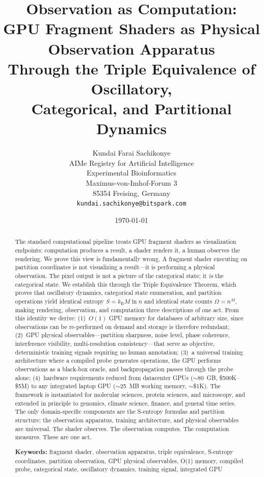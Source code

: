 \documentclass[11pt,twocolumn,a4paper]{article}
\title{\textbf{Observation as Computation:\\
GPU Fragment Shaders as Physical Observation Apparatus\\
Through the Triple Equivalence of Oscillatory,\\
Categorical, and Partitional Dynamics}}
\author{
Kundai Farai Sachikonye\\
AIMe Registry for Artificial Intelligence\\
Experimental Bioinformatics\\
Maximus-von-Imhof-Forum 3\\
85354 Freising, Germany\\
\texttt{kundai.sachikonye@bitspark.com}
}
\date{\today}
\theoremstyle{definition}
\theoremstyle{remark}
\newcommand{\kB}{k_{\mathrm{B}}}
\begin{document}
\maketitle

\begin{abstract}
The standard computational pipeline treats GPU fragment shaders as visualization endpoints: computation produces a result, a shader renders it, a human observes the rendering. We prove this view is fundamentally wrong. A fragment shader executing on partition coordinates is not visualizing a result---it is performing a physical observation. The pixel output is not a picture of the categorical state; it \emph{is} the categorical state. We establish this through the Triple Equivalence Theorem, which proves that oscillatory dynamics, categorical state enumeration, and partition operations yield identical entropy $S = \kB M \ln n$ and identical state counts $\Omega = n^M$, making rendering, observation, and computation three descriptions of one act. From this identity we derive: (1)~$O(1)$ GPU memory for databases of arbitrary size, since observations can be re-performed on demand and storage is therefore redundant; (2)~GPU physical observables---partition sharpness, noise level, phase coherence, interference visibility, multi-resolution consistency---that serve as objective, deterministic training signals requiring no human annotation; (3)~a universal training architecture where a compiled probe generates operations, the GPU performs observations as a black-box oracle, and backpropagation passes through the probe alone; (4)~hardware requirements reduced from datacenter GPUs ($\sim$80~GB, \$500K--\$5M) to any integrated laptop GPU ($\sim$25~MB working memory, $\sim$\$1K). The framework is instantiated for molecular sciences, protein sciences, and microscopy, and extended in principle to genomics, climate science, finance, and general time series. The only domain-specific components are the S-entropy formulas and partition structure; the observation apparatus, training architecture, and physical observables are universal. The shader observes. The observation computes. The computation measures. These are one act.

\medskip
\noindent\textbf{Keywords:} fragment shader, observation apparatus, triple equivalence, S-entropy coordinates, partition observation, GPU physical observables, O(1) memory, compiled probe, categorical state, oscillatory dynamics, training signal, integrated GPU
\end{abstract}
\end{document}
